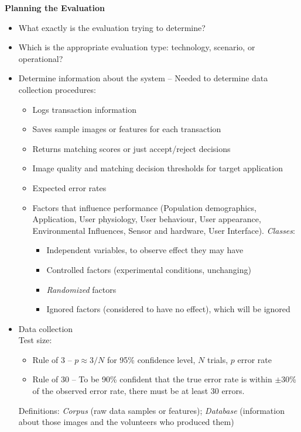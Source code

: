 \documentclass[a4paper]{article}
\begin{document}
      \textbf{Planning the Evaluation}
      \begin{itemize}
        \item What exactly is the evaluation trying to determine?
        \item Which is the appropriate evaluation type: technology, scenario, or operational?
        \item Determine information about the system -- Needed to determine data collection procedures:
        \begin{itemize}
          \item Logs transaction information
          \item Saves sample images or features for each transaction
          \item Returns matching scores or just accept/reject decisions
          \item Image quality and matching decision thresholds for target application
          \item Expected error rates
          \item Factors that influence performance (Population demographics, Application, User physiology, User behaviour, User appearance, Environmental Influences, Sensor and hardware, User Interface). \emph{Classes}:
          \begin{itemize}
            \item Independent variables, to observe effect they may have
            \item Controlled factors (experimental conditions, unchanging)
            \item \emph{Randomized} factors
            \item Ignored factors (considered to have no effect), which will be ignored
          \end{itemize}
        \end{itemize}
        \item Data collection\\
        Test size:
        \begin{itemize}
          \item Rule of 3 -- $p\approx 3/N$ for 95\% confidence level, $N$ trials, $p$ error rate
          \item Rule of 30 -- To be 90\% confident that the true error rate is within $\pm$30\% of the observed error rate, there must be at least 30 errors.
        \end{itemize}
        Definitions: \emph{Corpus} (raw data samples or features); \emph{Database} (information about those images and the volunteers who produced them)
      \end{itemize}
\end{document}
